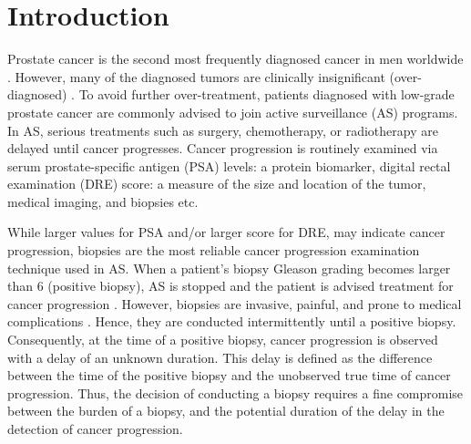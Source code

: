 
\section{Introduction}
\label{sec:introduction}
Prostate cancer is the second most frequently diagnosed cancer in men worldwide \cite{GlobalCancerStats2012}. However, many of the diagnosed tumors are clinically insignificant (over-diagnosed) \cite{etzioni2002overdiagnosis}. To avoid further over-treatment, patients diagnosed with low-grade prostate cancer are commonly advised to join active surveillance (AS) programs. In AS, serious treatments such as surgery, chemotherapy, or radiotherapy are delayed until cancer progresses. Cancer progression is routinely examined via serum prostate-specific antigen (PSA) levels: a protein biomarker, digital rectal examination (DRE) score: a measure of the size and location of the tumor, medical imaging, and biopsies etc.

While larger values for PSA and/or larger score for DRE, may indicate cancer progression, biopsies are the most reliable cancer progression examination technique used in AS. When a patient's biopsy Gleason grading becomes larger than 6 (positive biopsy), AS is stopped and the patient is advised treatment for cancer progression \cite{bokhorst2015compliance}. However, biopsies are invasive, painful, and prone to medical complications \cite{ehdaie2014impact,fujita2009serial}. Hence, they are conducted intermittently until a positive biopsy. Consequently, at the time of a positive biopsy, cancer progression is observed with a delay of an unknown duration. This delay is defined as the difference between the time of the positive biopsy and the unobserved true time of cancer progression. Thus, the decision of conducting a biopsy requires a fine compromise between the burden of a biopsy, and the potential duration of the delay in the detection of cancer progression.

